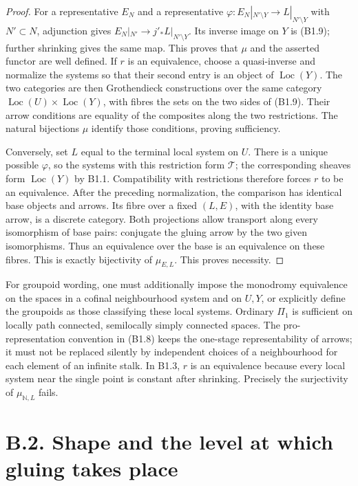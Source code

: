 \begin{proof}
For a representative $E_N$ and a representative
$\varphi:E_N|_{N'\setminus Y}\to L|_{N'\setminus Y}$ with $N'\subset N$,
adjunction gives $E_N|_{N'}\to j'_*L|_{N'\setminus Y}$.
Its inverse image on $Y$ is (B1.9); further shrinking gives the same
map. This proves that $\mu$ and the asserted functor are well defined.
If $r$ is an equivalence, choose a quasi-inverse and normalize the
systems so that their second entry is an object of
$\operatorname{Loc}(Y)$. The two categories are then Grothendieck
constructions over the same category
$\operatorname{Loc}(U)\times\operatorname{Loc}(Y)$, with fibres the
sets on the two sides of (B1.9). Their arrow conditions are equality
of the composites along the two restrictions. The natural bijections
$\mu$ identify those conditions, proving sufficiency.

Conversely, set $L$ equal to the terminal local system on $U$.
There is a unique possible $\varphi$, so the systems with this
restriction form $\mathcal T$; the corresponding sheaves form
$\operatorname{Loc}(Y)$ by B1.1. Compatibility with restrictions
therefore forces $r$ to be an equivalence. After the preceding
normalization, the comparison has identical base objects and arrows.
Its fibre over a fixed $(L,E)$, with the identity base arrow, is a
discrete category. Both projections allow transport along every
isomorphism of base pairs: conjugate the gluing arrow by the two
given isomorphisms. Thus an equivalence over the base is an
equivalence on these fibres. This is exactly bijectivity
of $\mu_{E,L}$. This proves necessity.
\end{proof}

For groupoid wording, one must additionally impose the monodromy
equivalence on the spaces in a cofinal neighbourhood system and on
$U,Y$, or explicitly define the groupoids as those classifying these
local systems. Ordinary $\Pi_1$ is sufficient on locally path connected,
semilocally simply connected spaces. The pro-representation convention
in (B1.8) keeps the one-stage representability of arrows; it must not
be replaced silently by independent choices of a neighbourhood for
each element of an infinite stalk. In B1.3, $r$ is an equivalence
because every local system near the single point is constant after
shrinking. Precisely the surjectivity of $\mu_{\mathbb N,L}$ fails.

\section{B.2. Shape and the level at which gluing takes place}

